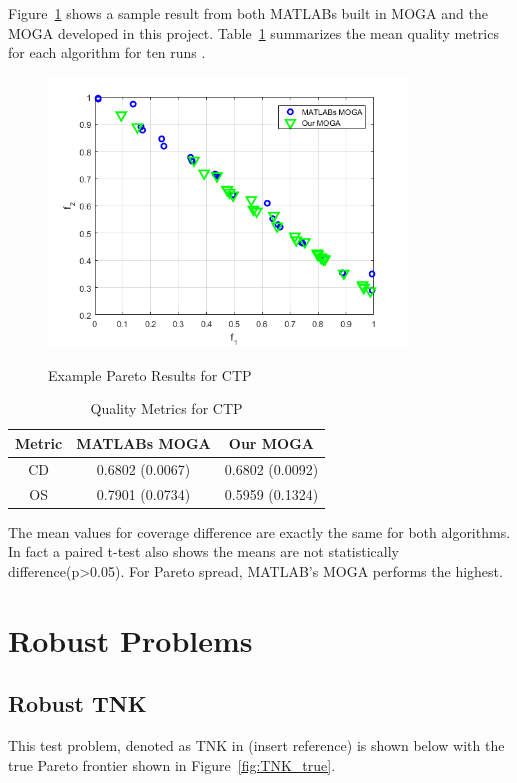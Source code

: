 \documentclass{article}
\begin{document}
Figure~\ref{fig:CTP} shows a sample result from both MATLABs built in MOGA and the MOGA developed in this project. Table~\ref{tab:CTP} summarizes the mean quality metrics for each algorithm for ten runs \cite{deb2001multi}.
\begin{figure}[h]
  \caption{Example Pareto Results for CTP}
  \centering
  \includegraphics[width=0.85\textwidth]{CTP_pareto_final.png}  
  \label{fig:CTP}
\end{figure}

\begin{table}[h]
\caption{Quality Metrics for CTP} 
\centering 
\begin{tabular}{|c|c|c|} 
\hline\hline  
Metric & MATLABs MOGA & Our MOGA \\ \hline
CD & 0.6802 (0.0067) &  0.6802 (0.0092) \\ \hline
OS & 0.7901 (0.0734) & 0.5959 (0.1324) \\ \hline
\end{tabular}
\label{tab:CTP} 
\end{table} 
 
The mean values for coverage difference are exactly the same for both algorithms. In fact a paired t-test also shows the means are not statistically difference(p>0.05). For Pareto spread, MATLAB's MOGA performs the highest.

\section{Robust Problems} 
 
\subsection{Robust TNK} 
This test problem, denoted as TNK in (insert reference) is shown below with the true Pareto frontier shown in Figure~\ref{fig:TNK_true}.
\end{document}
